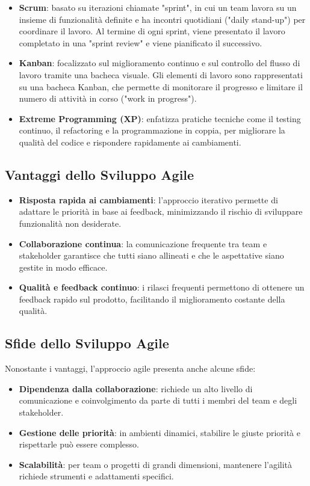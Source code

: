 \documentclass{article}
\begin{document}
\begin{itemize}
    \item \textbf{Scrum}: basato su iterazioni chiamate "sprint", in cui un team lavora su un insieme di funzionalità definite e ha incontri quotidiani ("daily stand-up") per coordinare il lavoro. Al termine di ogni sprint, viene presentato il lavoro completato in una "sprint review" e viene pianificato il successivo.
    \item \textbf{Kanban}: focalizzato sul miglioramento continuo e sul controllo del flusso di lavoro tramite una bacheca visuale. Gli elementi di lavoro sono rappresentati su una bacheca Kanban, che permette di monitorare il progresso e limitare il numero di attività in corso ("work in progress").
    \item \textbf{Extreme Programming (XP)}: enfatizza pratiche tecniche come il testing continuo, il refactoring e la programmazione in coppia, per migliorare la qualità del codice e rispondere rapidamente ai cambiamenti.
\end{itemize}

\subsection{Vantaggi dello Sviluppo Agile}
\begin{itemize}
    \item \textbf{Risposta rapida ai cambiamenti}: l'approccio iterativo permette di adattare le priorità in base ai feedback, minimizzando il rischio di sviluppare funzionalità non desiderate.
    \item \textbf{Collaborazione continua}: la comunicazione frequente tra team e stakeholder garantisce che tutti siano allineati e che le aspettative siano gestite in modo efficace.
    \item \textbf{Qualità e feedback continuo}: i rilasci frequenti permettono di ottenere un feedback rapido sul prodotto, facilitando il miglioramento costante della qualità.
\end{itemize}

\subsection{Sfide dello Sviluppo Agile}
Nonostante i vantaggi, l’approccio agile presenta anche alcune sfide:
\begin{itemize}
    \item \textbf{Dipendenza dalla collaborazione}: richiede un alto livello di comunicazione e coinvolgimento da parte di tutti i membri del team e degli stakeholder.
    \item \textbf{Gestione delle priorità}: in ambienti dinamici, stabilire le giuste priorità e rispettarle può essere complesso.
    \item \textbf{Scalabilità}: per team o progetti di grandi dimensioni, mantenere l'agilità richiede strumenti e adattamenti specifici.
\end{itemize}
\end{document}
